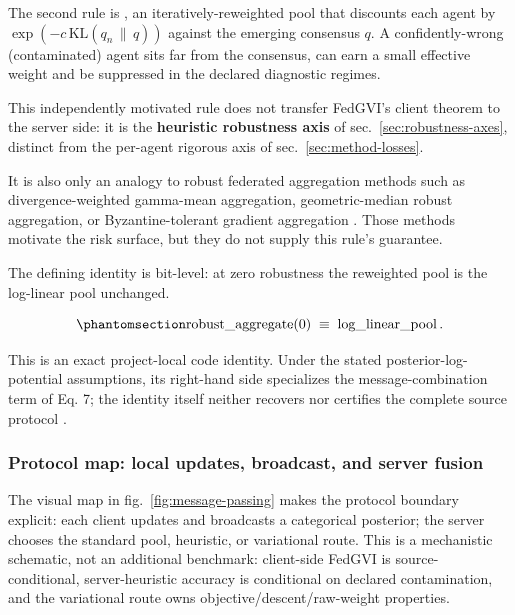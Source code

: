 \documentclass[
  english,
]{article}
\theoremstyle{plain}
\theoremstyle{definition}
\theoremstyle{remark}
\theoremstyle{definition}
\begin{document}
The second rule is \textbf{}, an
iteratively-reweighted pool that discounts each agent by
\(\exp(-c\,\mathrm{KL}(q_n \,\|\, q))\) against the emerging consensus
\(q\). A confidently-wrong (contaminated) agent sits far from the
consensus, can earn a small effective weight and be suppressed in the
declared diagnostic regimes.

This independently motivated rule does not transfer FedGVI's client
theorem to the server side: it is the \textbf{heuristic robustness axis}
of sec.~\ref{sec:robustness-axes}, distinct from the per-agent rigorous
axis of sec.~\ref{sec:method-losses}.

It is also only an analogy to robust federated aggregation methods such
as divergence-weighted gamma-mean aggregation, geometric-median robust
aggregation, or Byzantine-tolerant gradient aggregation
\citep{li2022gammafl, pillutla2022robust, blanchard2017krum}. Those
methods motivate the risk surface, but they do not supply this rule's
guarantee.

The defining identity is bit-level: at zero robustness the reweighted
pool is the log-linear pool unchanged.

\begin{equation}\protect\phantomsection\label{eq:robust-identity}{\operatorname{robust\_aggregate}(0)
\;\equiv\;
\operatorname{log\_linear\_pool}.}\end{equation}

This is an exact project-local code identity. Under the stated
posterior-log-potential assumptions, its right-hand side specializes the
message-combination term of Eq. 7; the identity itself neither recovers
nor certifies the complete source protocol \citep{friston2024federated}.

\subsubsection{Protocol map: local updates, broadcast, and server
fusion}\label{sec:method-message-passing}

The visual map in fig.~\ref{fig:message-passing} makes the protocol
boundary explicit: each client updates and broadcasts a categorical
posterior; the server chooses the standard pool, heuristic, or
variational route. This is a mechanistic schematic, not an additional
benchmark: client-side FedGVI is source- conditional, server-heuristic
accuracy is conditional on declared contamination, and the variational
route owns objective/descent/raw-weight properties.
\end{document}
